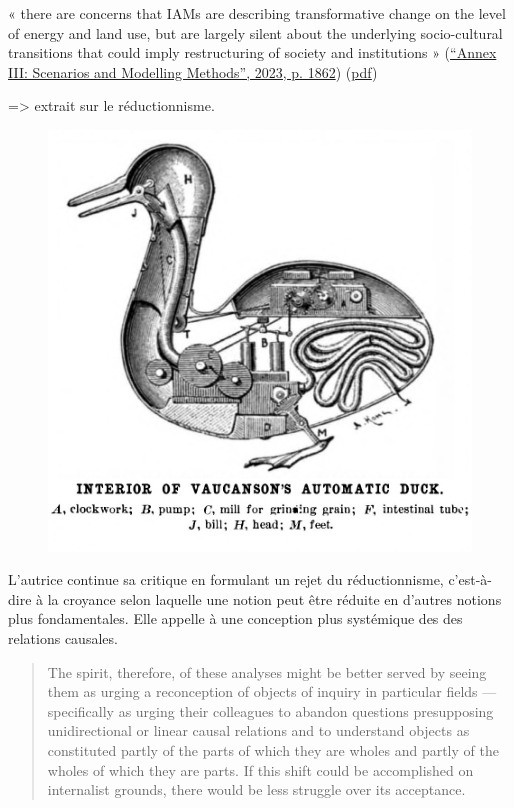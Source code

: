 « there are concerns that IAMs are describing transformative change on the level of energy and land use, but are largely silent about the underlying socio-cultural transitions that could imply restructuring of society and institutions » (\href{zotero://select/library/items/2SDDNUUF}{“Annex III: Scenarios and Modelling Methods”, 2023, p. 1862}) (\href{zotero://open-pdf/library/items/CHVFSLLH?page=22&annotation=JY4VBIZY}{pdf})



=> extrait sur le réductionnisme.

\begin{figure}
    \centering
    \includegraphics[width=0.75\linewidth]{reductionisme.png}
    \label{fig:reductionnisme}
\end{figure}

\begin{quote}
    
\end{quote}

L'autrice continue sa critique en formulant un rejet du réductionnisme, c'est-à-dire à la croyance selon laquelle une notion peut être réduite en d'autres notions plus fondamentales. Elle appelle à une conception plus systémique des des relations causales. 

\begin{quote}
    The spirit, therefore, of these analyses might be better served by seeing them as urging a reconception of objects of inquiry in particular fields — specifically as urging their colleagues to abandon questions presupposing unidirectional or linear causal relations and to understand objects as constituted partly of the parts of which they are wholes and partly of the wholes of which they are parts. If this shift could be accomplished on internalist grounds, there would be less struggle over its acceptance.
\end{quote}

